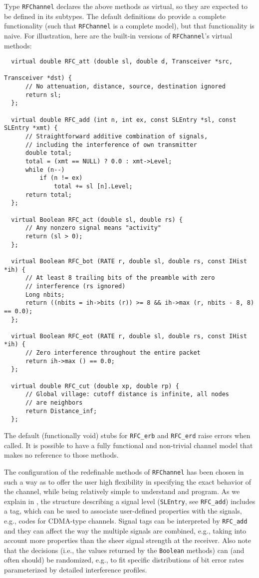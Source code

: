 Type {\tt RFChannel} declares the above methods as virtual, so they are
expected to be defined in its subtypes.
The default definitions do provide a complete functionality (such that
{\tt RFChannel} is a complete model), but that functionality is naive.
For illustration, here are the built-in versions of {\tt RFChannel}'s
virtual methods:

{\small\begin{verbatim}
  virtual double RFC_att (double sl, double d, Transceiver *src,
                                                              Transceiver *dst) {
      // No attenuation, distance, source, destination ignored
      return sl;
  };

  virtual double RFC_add (int n, int ex, const SLEntry *sl, const SLEntry *xmt) {
      // Straightforward additive combination of signals,
      // including the interference of own transmitter
      double total;
      total = (xmt == NULL) ? 0.0 : xmt->Level;
      while (n--)
          if (n != ex)
              total += sl [n].Level;
      return total;
  };

  virtual Boolean RFC_act (double sl, double rs) {
      // Any nonzero signal means "activity"
      return (sl > 0);
  };

  virtual Boolean RFC_bot (RATE r, double sl, double rs, const IHist *ih) {
      // At least 8 trailing bits of the preamble with zero
      // interference (rs ignored)
      Long nbits;
      return ((nbits = ih->bits (r)) >= 8 && ih->max (r, nbits - 8, 8) == 0.0);
  };

  virtual Boolean RFC_eot (RATE r, double sl, double rs, const IHist *ih) {
      // Zero interference throughout the entire packet
      return ih->max () == 0.0;
  };

  virtual double RFC_cut (double xp, double rp) {
      // Global village: cutoff distance is infinite, all nodes
      // are neighbors
      return Distance_inf;
  };
\end{verbatim}}

The default (functionally void) stubs for {\tt RFC\_erb} and {\tt RFC\_erd}
raise errors when called.
It is possible to have a fully functional and non-trivial channel model that
makes no reference to those methods.

The configuration of the redefinable methods of {\tt RFChannel} has been
chosen in such a way as to offer the user high flexibility in specifying
the exact behavior of the channel, while being relatively simple to 
understand and program.
As we explain in , the structure describing a signal level
({\tt SLEntry}, see {\tt RFC\_add})
includes a tag, which can be used to associate user-defined
properties with the signals, e.g., codes for CDMA-type channels.
Signal tags can be interpreted by {\tt RFC\_add} and they can affect
the way the multiple signals are combined,
e.g., taking into account more properties than the sheer signal
strength at the receiver.
Also note that the decisions (i.e., the values returned by the {\tt Boolean}
methods) can (and often should) be randomized,
e.g., to fit specific distributions of bit
error rates parameterized by detailed interference profiles.

